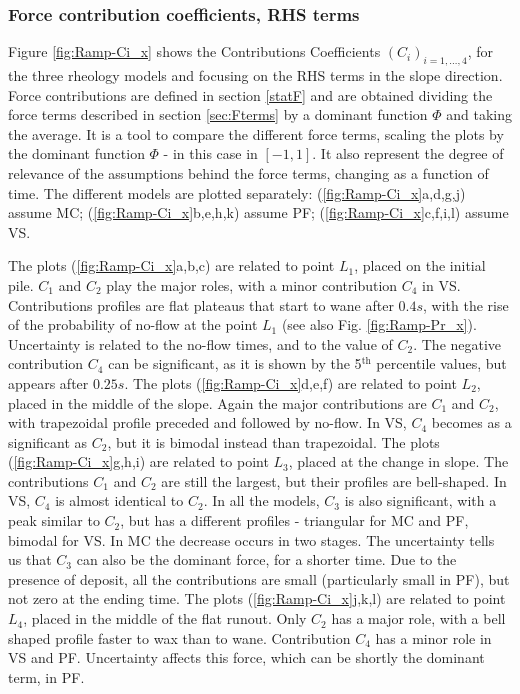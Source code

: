 \documentclass{article}
\begin{document}
\subsubsection{Force contribution coefficients, RHS terms}
Figure \ref{fig:Ramp-Ci_x} shows the Contributions Coefficients $(C_i)_{i=1,\dots,4}$, for the three rheology models and focusing on the RHS terms in the slope direction. Force contributions are defined in section \ref{statF} and are obtained dividing the force terms described in section \ref{sec:Fterms} by a dominant function $\Phi$ and taking the average. It is a tool to compare the different force terms, scaling the plots by the dominant function $\Phi$ - in this case in $[-1,1]$. It also represent the degree of relevance of the assumptions behind the force terms, changing as a function of time. The different models are plotted separately: (\ref{fig:Ramp-Ci_x}a,d,g,j) assume MC; (\ref{fig:Ramp-Ci_x}b,e,h,k) assume PF; (\ref{fig:Ramp-Ci_x}c,f,i,l) assume VS.

The plots (\ref{fig:Ramp-Ci_x}a,b,c) are related to point $L_1$, placed on the initial pile. $C_1$ and $C_2$ play the major roles, with a minor contribution $C_4$ in VS. Contributions profiles are flat plateaus that start to wane after $0.4 s$, with the rise of the probability of no-flow at the point $L_1$ (see also Fig. \ref{fig:Ramp-Pr_x}). Uncertainty is related to the no-flow times, and to the value of $C_2$. The negative contribution $C_4$ can be significant, as it is shown by the 5$^{\mathrm{th}}$ percentile values, but appears after $0.25 s$. The plots (\ref{fig:Ramp-Ci_x}d,e,f) are related to point $L_2$, placed in the middle of the slope. Again the major contributions are $C_1$ and $C_2$, with trapezoidal profile preceded and followed by no-flow. In VS, $C_4$ becomes as a significant as $C_2$, but it is bimodal instead than trapezoidal. The plots (\ref{fig:Ramp-Ci_x}g,h,i) are related to point $L_3$, placed at the change in slope. The contributions $C_1$ and $C_2$ are still the largest, but their profiles are bell-shaped. In VS, $C_4$ is almost identical to $C_2$. In all the models, $C_3$ is also significant, with a peak similar to $C_2$, but has a different profiles - triangular for MC and PF, bimodal for VS. In MC the decrease occurs in two stages. The uncertainty tells us that $C_3$ can also be the dominant force, for a shorter time. Due to the presence of deposit, all the contributions are small (particularly small in PF), but not zero at the ending time. The plots (\ref{fig:Ramp-Ci_x}j,k,l) are related to point $L_4$, placed in the middle of the flat runout. Only $C_2$ has a major role, with a bell shaped profile faster to wax than to wane. Contribution $C_4$ has a minor role in VS and PF. Uncertainty affects this force, which can be shortly the dominant term, in PF.
\end{document}
